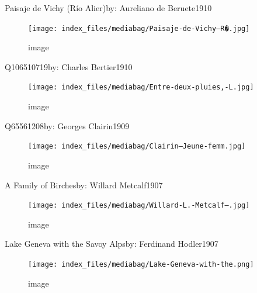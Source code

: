 \documentclass[
  a4paper,
]{book}
\begin{document}
\label{http:ux2fux2fwww.wikidata.orgux2fentityux2fQ65960306}
Paisaje de Vichy (Río Alier)by: Aureliano de Beruete1910

\begin{figure}[H]

{\centering \texttt{[image: index\_files/mediabag/Paisaje-de-Vichy--R�.jpg]}

}

\caption{image}

\end{figure}%

\label{http:ux2fux2fwww.wikidata.orgux2fentityux2fQ106510719}
Q106510719by: Charles Bertier1910

\begin{figure}[H]

{\centering \texttt{[image: index\_files/mediabag/Entre-deux-pluies,-L.jpg]}

}

\caption{image}

\end{figure}%

\label{http:ux2fux2fwww.wikidata.orgux2fentityux2fQ65561208}
Q65561208by: Georges Clairin1909

\begin{figure}[H]

{\centering \texttt{[image: index\_files/mediabag/Clairin---Jeune-femm.jpg]}

}

\caption{image}

\end{figure}%

\label{http:ux2fux2fwww.wikidata.orgux2fentityux2fQ20491800}
A Family of Birchesby: Willard Metcalf1907

\begin{figure}[H]

{\centering \texttt{[image: index\_files/mediabag/Willard-L.-Metcalf--.jpg]}

}

\caption{image}

\end{figure}%

\label{http:ux2fux2fwww.wikidata.orgux2fentityux2fQ64787177}
Lake Geneva with the Savoy Alpsby: Ferdinand Hodler1907

\begin{figure}[H]

{\centering \texttt{[image: index\_files/mediabag/Lake-Geneva-with-the.png]}

}

\caption{image}

\end{figure}%
\end{document}
